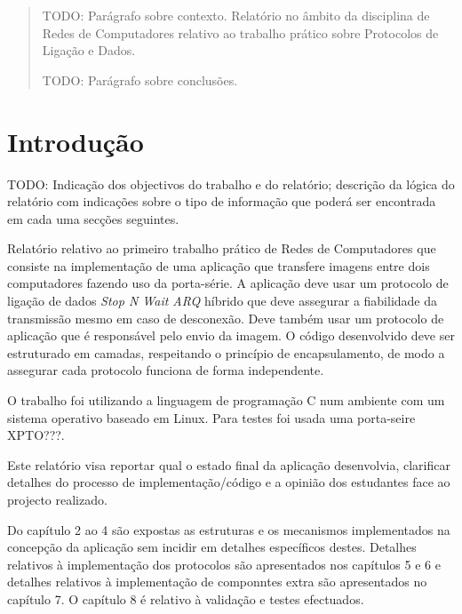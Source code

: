 \documentclass[11pt,a4paper,reqno]{report}
\numberwithin{equation}{section}
\begin{document}



\begin{abstract}
	
TODO: Parágrafo sobre contexto.
Relatório no âmbito da disciplina de Redes de Computadores relativo ao trabalho prático sobre Protocolos de Ligação e Dados.

TODO: Parágrafo sobre conclusões.

\end{abstract}

\tableofcontents


\chapter{Introdução}

TODO: Indicação dos objectivos do trabalho e do relatório; descrição da lógica do relatório com indicações sobre o tipo de informação que poderá ser encontrada em cada uma secções seguintes.

Relatório relativo ao primeiro trabalho prático de Redes de Computadores que consiste na implementação de uma aplicação que transfere imagens entre dois computadores fazendo uso da porta-série. A aplicação deve usar um protocolo de ligação de dados \emph{Stop N Wait ARQ} híbrido que deve assegurar a fiabilidade  da transmissão mesmo em caso de desconexão. Deve também usar um protocolo de aplicação que é responsável pelo envio da imagem. O código desenvolvido deve ser estruturado em camadas, respeitando o princípio de encapsulamento, de modo a assegurar cada protocolo funciona de forma independente.
	
	O trabalho foi utilizando a linguagem de programação C num ambiente com um sistema operativo baseado em Linux. Para testes foi usada uma porta-seire XPTO???.
	
	Este relatório visa reportar qual o estado final da aplicação desenvolvia, clarificar detalhes do processo de implementação/código e a opinião dos estudantes face ao projecto realizado.
	
	Do capítulo 2 ao 4 são expostas as estruturas e os mecanismos implementados na concepção da aplicação sem incidir em detalhes específicos destes.
	Detalhes relativos à implementação dos protocolos são apresentados nos capítulos 5 e 6 e detalhes relativos à implementação de componntes extra são apresentados no capítulo 7.
	O capítulo 8 é relativo à validação e testes efectuados.
	
\end{document}
